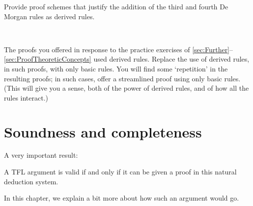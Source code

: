 \begin{practiceproblems}

\problempart
Provide proof schemes that justify the addition of the third and fourth De Morgan rules as derived rules.

\

\problempart
The proofs you offered in response to the practice exercises of \cref{sec:Further}--\ref{sec:ProofTheoreticConcepts} used derived rules. Replace the use of derived rules, in such proofs, with only basic rules. You will find some `repetition' in the resulting proofs; in such cases, offer a streamlined proof using only basic rules.  (This will give you a sense, both of the power of derived rules, and of how all the rules interact.)

\end{practiceproblems}

\chapter{Soundness and completeness}
\label{sec:soundness_and_completeness}\nonexaminable

A very important result:
\begin{highlighted}
A TFL argument is valid if and only if it can be given a proof in this natural deduction system.
\end{highlighted}
In this chapter, we explain a bit more about how such an argument would go. 

